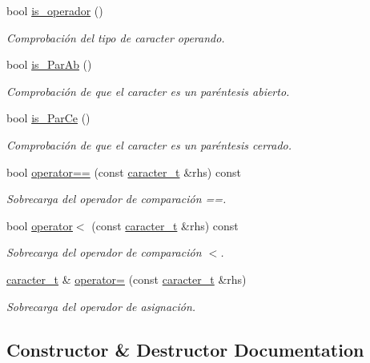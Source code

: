 \begin{DoxyCompactItemize}
bool \hyperlink{classcaracter__t_a6e809f80ee947c95e5ab876744345a00}{is\+\_\+operador} ()
\begin{DoxyCompactList}\small\item\em Comprobación del tipo de caracter operando. \end{DoxyCompactList}\item 
bool \hyperlink{classcaracter__t_a2f21204c13bd2befe3af92a99a0534ca}{is\+\_\+\+Par\+Ab} ()
\begin{DoxyCompactList}\small\item\em Comprobación de que el caracter es un paréntesis abierto. \end{DoxyCompactList}\item 
bool \hyperlink{classcaracter__t_af29d91fd4e785878f4654e5580761160}{is\+\_\+\+Par\+Ce} ()
\begin{DoxyCompactList}\small\item\em Comprobación de que el caracter es un paréntesis cerrado. \end{DoxyCompactList}\item 
bool \hyperlink{classcaracter__t_a0d7683da248d753f3c9359a18b61592e}{operator==} (const \hyperlink{classcaracter__t}{caracter\+\_\+t} \&rhs) const
\begin{DoxyCompactList}\small\item\em Sobrecarga del operador de comparación ==. \end{DoxyCompactList}\item 
bool \hyperlink{classcaracter__t_a37981f4c8bed422fc7fdfb88acdc9e33}{operator$<$} (const \hyperlink{classcaracter__t}{caracter\+\_\+t} \&rhs) const
\begin{DoxyCompactList}\small\item\em Sobrecarga del operador de comparación $<$. \end{DoxyCompactList}\item 
\hyperlink{classcaracter__t}{caracter\+\_\+t} \& \hyperlink{classcaracter__t_ae96b9e606ea56bcafb360c6d40296ce5}{operator=} (const \hyperlink{classcaracter__t}{caracter\+\_\+t} \&rhs)
\begin{DoxyCompactList}\small\item\em Sobrecarga del operador de asignación. \end{DoxyCompactList}\end{DoxyCompactItemize}


\subsection{Constructor \& Destructor Documentation}
\mbox{\label{classcaracter__t_a9040b01285473517675854109c201deb}} 
